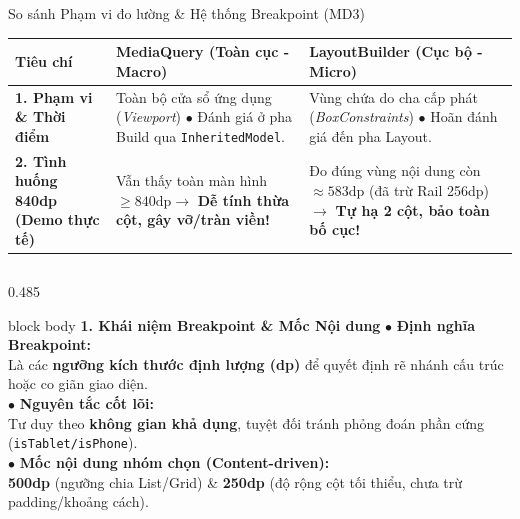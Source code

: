 \documentclass[aspectratio=169, 10pt]{beamer}
\begin{document}
\begin{frame}{So sánh Phạm vi đo lường \& Hệ thống Breakpoint (MD3)}
  \vspace{-0.25cm}
  \centering
  \footnotesize
  \setlength{\tabcolsep}{5pt}
  \renewcommand{\arraystretch}{1.15}
  \begin{tabular}{|>{\raggedright\arraybackslash}p{2.2cm}|>{\raggedright\arraybackslash}p{4.95cm}|>{\raggedright\arraybackslash}p{5.05cm}|}
    \hline
    \rowcolor{TableHead}
    \centering\color{white}\textbf{Tiêu chí} & 
    \centering\color{white}\textbf{MediaQuery (Toàn cục - Macro)} & 
    \centering\color{white}\textbf{LayoutBuilder (Cục bộ - Micro)} \tabularnewline
    \hline
    \rowcolor{TableRowOdd}
    \textbf{1. Phạm vi \& Thời điểm} & 
    Toàn bộ cửa sổ ứng dụng (\textit{Viewport}) $\bullet$ Đánh giá ở pha Build qua \texttt{InheritedModel}. & 
    Vùng chứa do cha cấp phát (\textit{BoxConstraints}) $\bullet$ Hoãn đánh giá đến pha Layout. \tabularnewline
    \hline
    \rowcolor{TableRowEven}
    \textbf{2. Tình huống 840dp (Demo thực tế)} & 
    Vẫn thấy toàn màn hình $\ge 840\text{dp} \rightarrow$ \textbf{Dễ tính thừa cột, gây vỡ/tràn viền!} & 
    Đo đúng vùng nội dung còn $\approx 583\text{dp}$ (đã trừ Rail 256dp) $\rightarrow$ \textbf{Tự hạ 2 cột, bảo toàn bố cục!} \tabularnewline
    \hline
  \end{tabular}

  \vspace{0.12cm}
  \begin{columns}[T]
    \begin{column}{0.485\textwidth}
      \begin{beamercolorbox}[rounded=true, shadow=false, wd=\textwidth, sep=3.5pt]{block body}
        \textbf{\scriptsize\color{blue!80!black}1. Khái niệm Breakpoint \& Mốc Nội dung}
        \vskip 0.04cm
        \scriptsize
        $\bullet$ \textbf{Định nghĩa Breakpoint:}\\
        Là các \textbf{ngưỡng kích thước định lượng (dp)} để quyết định rẽ nhánh cấu trúc hoặc co giãn giao diện.\\[0.05cm]
        $\bullet$ \textbf{Nguyên tắc cốt lõi:}\\
        Tư duy theo \textbf{không gian khả dụng}, tuyệt đối tránh phỏng đoán phần cứng (\texttt{isTablet/isPhone}).\\[0.05cm]
        $\bullet$ \textbf{Mốc nội dung nhóm chọn (Content-driven):}\\
        \textbf{500dp} (ngưỡng chia List/Grid) \& \textbf{250dp} (độ rộng cột tối thiểu, chưa trừ padding/khoảng cách).
      \end{beamercolorbox}
    \end{column}


\end{columns}
\end{frame}
\end{document}
